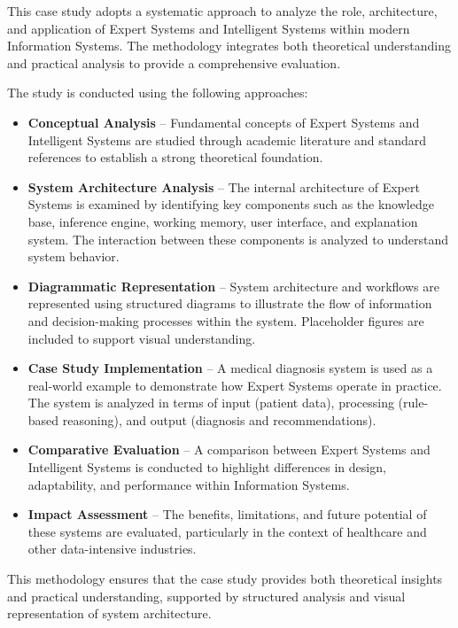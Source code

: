 \documentclass[12pt]{article}
\begin{document}
This case study adopts a systematic approach to analyze the role, architecture, and application of Expert Systems and Intelligent Systems within modern Information Systems. The methodology integrates both theoretical understanding and practical analysis to provide a comprehensive evaluation.

The study is conducted using the following approaches:

\begin{itemize}
    \item \textbf{Conceptual Analysis} -- Fundamental concepts of Expert Systems and Intelligent Systems are studied through academic literature and standard references to establish a strong theoretical foundation.
    
    \item \textbf{System Architecture Analysis} -- The internal architecture of Expert Systems is examined by identifying key components such as the knowledge base, inference engine, working memory, user interface, and explanation system. The interaction between these components is analyzed to understand system behavior.
    
    \item \textbf{Diagrammatic Representation} -- System architecture and workflows are represented using structured diagrams to illustrate the flow of information and decision-making processes within the system. Placeholder figures are included to support visual understanding.
    
    \item \textbf{Case Study Implementation} -- A medical diagnosis system is used as a real-world example to demonstrate how Expert Systems operate in practice. The system is analyzed in terms of input (patient data), processing (rule-based reasoning), and output (diagnosis and recommendations).
    
    \item \textbf{Comparative Evaluation} -- A comparison between Expert Systems and Intelligent Systems is conducted to highlight differences in design, adaptability, and performance within Information Systems.
    
    \item \textbf{Impact Assessment} -- The benefits, limitations, and future potential of these systems are evaluated, particularly in the context of healthcare and other data-intensive industries.
\end{itemize}

This methodology ensures that the case study provides both theoretical insights and practical understanding, supported by structured analysis and visual representation of system architecture.
\end{document}
